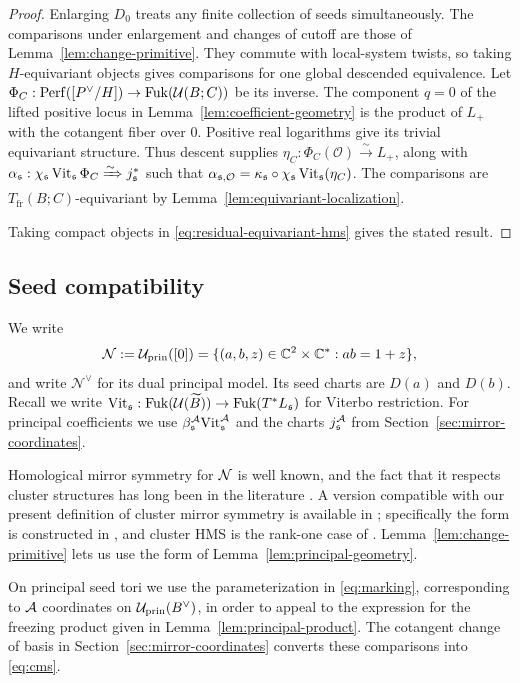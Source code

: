 \documentclass[12pt, letter]{amsart}
\theoremstyle{definition}
\newcommand{\OO}{\mathcal O}
\newcommand{\Nn}{\mathcal N}
\newcommand{\pr}{\mathrm{prin}}
\newcommand{\fr}{\mathrm{fr}}
\DeclareMathOperator{\Vit}{Vit}
\numberwithin{equation}{section}
\begin{document}
\begin{proof}
Enlarging $D_0$ treats any finite collection of seeds simultaneously.
The comparisons under enlargement and changes of cutoff are those of
Lemma~\ref{lem:change-primitive}.
They commute with local-system twists, so taking $H$-equivariant
objects gives comparisons for one global descended equivalence.
Let $\Phi_C:\mathrm{Perf}([P^\vee/H])\to\operatorname{Fuk}(\mathcal{U}(B;C))$ be its inverse.
The component $q=0$ of the lifted positive locus in
Lemma~\ref{lem:coefficient-geometry} is the product of $L_+$ with the
cotangent fiber over $0$.
Positive real logarithms give its trivial equivariant structure.
Thus descent supplies $\eta_C:\Phi_C(\OO)\xrightarrow{\sim}L_+$, along with 
$\alpha_{\fs}:\chi_{\fs}\Vit_{\fs}\Phi_C\xRightarrow{\sim}j_{\fs}^*$ such that $ \alpha_{\fs,\OO}=\kappa_{\fs}\circ\chi_{\fs}\Vit_{\fs}(\eta_C)$.
The comparisons are $T_{\fr}(B;C)$-equivariant by
Lemma~\ref{lem:equivariant-localization}.


Taking compact objects in \eqref{eq:residual-equivariant-hms}
gives the stated result. 
\end{proof}


\subsection{Seed compatibility}

We write
\[
 \Nn := \cU_{\pr}([0]) = \{(a,b,z)\in\C^2\times\C^*:ab=1+z\},
\]
and write $\Nn^\vee$ for its dual principal model.
Its seed charts are $D(a)$ and $D(b)$.
Recall we write  $\mathrm{Vit}_{\mathfrak{s}}:\operatorname{Fuk}(\mathcal{U}(\widetilde B))\to\operatorname{Fuk}(T^*L_{\mathfrak{s}})$
for Viterbo restriction.
For principal coefficients we use
$\beta_{\mathfrak{s}}^{\mathcal{A}}\mathrm{Vit}_{\mathfrak{s}}^{\mathcal{A}}$ and the charts $j_{\mathfrak{s}}^{\mathcal{A}}$
from Section~\ref{sec:mirror-coordinates}.

Homological mirror symmetry for $\mathcal{N}$ is well known, and the fact that it respects cluster structures has long been in the literature \cite{seidel-categorical-dynamics,  GLe, PT}.  A version compatible with our present definition of cluster mirror symmetry is available in \cite{HS}; specifically the form is constructed in \cite[Section~4.2, Lemma~4.7]{HS}, and cluster HMS is the
rank-one case of \cite[Theorem~1.3 and Sections~5.3--5.4]{HS}. 
Lemma~\ref{lem:change-primitive} lets us
use the form of Lemma~\ref{lem:principal-geometry}.



On principal seed tori we use the parameterization in \eqref{eq:marking}, corresponding to $\mathcal{A}$ coordinates on $\cU_{\pr}(B^\vee)$, in order to appeal to the 
expression for the freezing product  given in Lemma~\ref{lem:principal-product}.
The cotangent change of basis in Section~\ref{sec:mirror-coordinates}
converts these comparisons into \eqref{eq:cms}.
\end{document}

